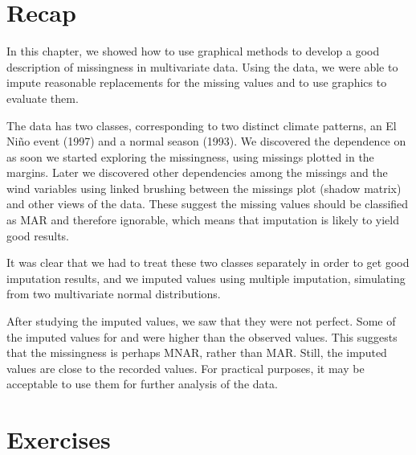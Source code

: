 \section{Recap}

In this chapter, we showed how to use graphical methods to develop
a good description of missingness in multivariate data. Using the
 data, we were able to impute reasonable replacements for
the missing values and to use graphics to evaluate them.

 The data has two classes, corresponding to two
distinct climate patterns, an El Ni\~no event (1997) and a normal
season (1993).  We discovered the dependence on  as soon we
started exploring the missingness, using missings plotted in the
margins.  Later we discovered other dependencies among the missings
and the wind variables using linked brushing between the missings plot
(shadow matrix) and other views of the data. These suggest the missing
values should be classified as MAR and therefore ignorable, which
means that imputation is likely to yield good results.

It was clear that we had to treat these two classes separately in
order to get good imputation results, and we imputed values using
multiple imputation, simulating from two multivariate normal
distributions.

After studying the imputed values, we saw that they were not perfect.
Some of the imputed values for  and  were higher than the observed values. This
suggests that the missingness is perhaps MNAR, rather than MAR. Still,
the imputed values are close to the recorded values.  For practical
purposes, it may be acceptable to use them for further analysis of the
data.


\section*{Exercises}

